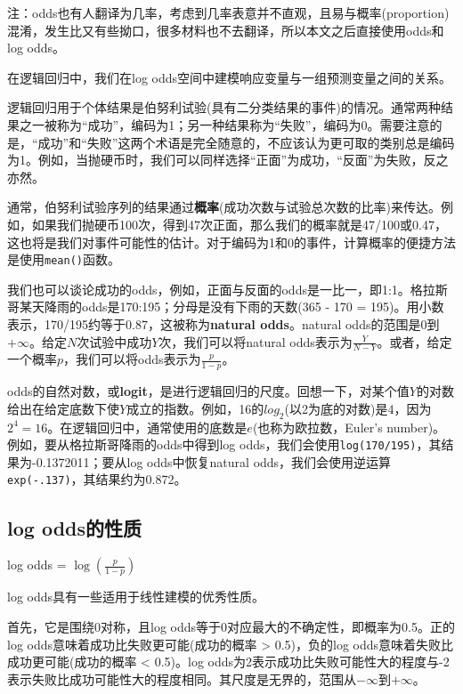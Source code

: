 \documentclass[
]{book}
\begin{document}
注：odds也有人翻译为几率，考虑到几率表意并不直观，且易与概率(proportion)混淆，发生比又有些拗口，很多材料也不去翻译，所以本文之后直接使用odds和log odds。

在逻辑回归中，我们在log odds空间中建模响应变量与一组预测变量之间的关系。

逻辑回归用于个体结果是伯努利试验(具有二分类结果的事件)的情况。通常两种结果之一被称为``成功''，编码为1；另一种结果称为``失败''，编码为0。需要注意的是，``成功''和``失败''这两个术语是完全随意的，不应该认为更可取的类别总是编码为1。例如，当抛硬币时，我们可以同样选择``正面''为成功，``反面''为失败，反之亦然。

通常，伯努利试验序列的结果通过\textbf{概率}(成功次数与试验总次数的比率)来传达。例如，如果我们抛硬币100次，得到47次正面，那么我们的概率就是47/100或0.47，这也将是我们对事件可能性的估计。对于编码为1和0的事件，计算概率的便捷方法是使用\texttt{mean()}函数。

我们也可以谈论成功的odds，例如，正面与反面的odds是一比一，即1:1。格拉斯哥某天降雨的odds是170:195；分母是没有下雨的天数(365 - 170 = 195)。用小数表示，170/195约等于0.87，这被称为\textbf{natural odds}。natural odds的范围是0到\(+\infty\)。给定\(N\)次试验中成功\(Y\)次，我们可以将natural odds表示为\(\frac{Y}{N - Y}\)。或者，给定一个概率\(p\)，我们可以将odds表示为\(\frac{p}{1-p}\)。

odds的自然对数，或\textbf{logit}，是进行逻辑回归的尺度。回想一下，对某个值\(Y\)的对数给出在给定底数下使\(Y\)成立的指数。例如，16的\(log_2\)(以2为底的对数)是4，因为\(2^4 = 16\)。在逻辑回归中，通常使用的底数是\(e\)(也称为欧拉数，Euler's number)。例如，要从格拉斯哥降雨的odds中得到log odds，我们会使用\texttt{log(170/195)}，其结果为-0.1372011；要从log odds中恢复natural odds，我们会使用逆运算\texttt{exp(-.137)}，其结果约为0.872。

\hypertarget{log-oddsux7684ux6027ux8d28}{%
\subsection{log odds的性质}\label{log-oddsux7684ux6027ux8d28}}

log odds = \(\log \left(\frac{p}{1-p}\right)\)

log odds具有一些适用于线性建模的优秀性质。

首先，它是围绕0对称，且log odds等于0对应最大的不确定性，即概率为0.5。正的log odds意味着成功比失败更可能(成功的概率 \textgreater{} 0.5)，负的log odds意味着失败比成功更可能(成功的概率 \textless{} 0.5)。log odds为2表示成功比失败可能性大的程度与-2表示失败比成功可能性大的程度相同。其尺度是无界的，范围从\(-\infty\)到\(+\infty\)。
\end{document}
